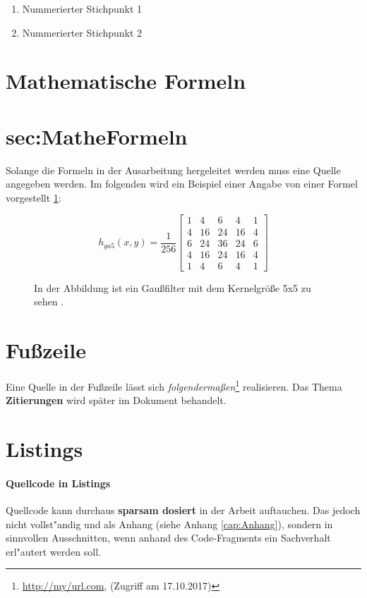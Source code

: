 \begin{enumerate}
\item Nummerierter Stichpunkt 1
\item Nummerierter Stichpunkt 2
\end{enumerate}


\section{Mathematische Formeln}
\section{sec:MatheFormeln}
Solange die Formeln in der Ausarbeitung hergeleitet werden muss eine Quelle angegeben werden. Im folgenden wird ein Beispiel einer Angabe von einer Formel vorgestellt \ref{Formel:Binomailfilter5x5}:


\begin{figure}[htbp]
  \centering 
   \[
   h_{ga 5}(x,y) = \frac{1}{256} \begin{bmatrix}
	1 & 4  & 6 & 4 & 1 \\
	4 & 16 & 24 & 16 & 4 \\
	6 & 24 & 36 & 24 & 6 \\
	4 & 16 & 24 & 16 & 4 \\
	1 & 4  & 6 & 4 & 1
	\end{bmatrix} 
   \]
   \renewcommand\figurename{Formel}
   \caption[Formel für einen 5x5 Binomialfilter]%
  {In der Abbildung ist ein Gaußfilter mit dem Kernelgröße 5x5 zu sehen \cite{Segmentierung:DigitaleBildvearbeitung}.}    
  \label{Formel:Binomailfilter5x5}        
\end{figure}



\section{Fu{\ss}zeile}
\label{sec:Fusszeile}

Eine Quelle in der Fußzeile lässt sich \textit{folgendermaßen}\footnote{\url{http://my/url.com}, (Zugriff am 17.10.2017)} realisieren. Das Thema \textbf{Zitierungen} wird später im Dokument behandelt.

\section{Listings}
\label{sec:Listings}

\paragraph{Quellcode in Listings}
Quellcode kann durchaus \textbf{sparsam dosiert} in der Arbeit auftauchen.
Das jedoch nicht vollst"andig und als Anhang (siehe Anhang \ref{cap:Anhang}), sondern in sinnvollen Ausschnitten, wenn anhand des Code-Fragments ein Sachverhalt erl"autert werden soll.

